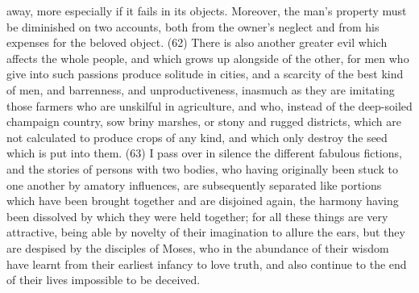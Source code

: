 away, more especially if it fails in its objects. Moreover, the man's property must be diminished on
two accounts, both from the owner's neglect and from his expenses for the beloved object. (62)
There is also another greater evil which affects the whole people, and which grows up alongside of
the other, for men who give into such passions produce solitude in cities, and a scarcity of the best
kind of men, and barrenness, and unproductiveness, inasmuch as they are imitating those farmers
who are unskilful in agriculture, and who, instead of the deep-soiled champaign country, sow briny
marshes, or stony and rugged districts, which are not calculated to produce crops of any kind, and
which only destroy the seed which is put into them. (63) I pass over in silence the different fabulous
fictions, and the stories of persons with two bodies, who having originally been stuck to one
another by amatory influences, are subsequently separated like portions which have been brought
together and are disjoined again, the harmony having been dissolved by which they were held
together; for all these things are very attractive, being able by novelty of their imagination to allure
the ears, but they are despised by the disciples of Moses, who in the abundance of their wisdom
have learnt from their earliest infancy to love truth, and also continue to the end of their lives
impossible to be deceived.

